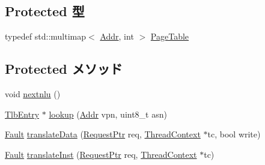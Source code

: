 \subsection*{Protected 型}
\begin{DoxyCompactItemize}
\item 
typedef std::multimap$<$ \hyperlink{classm5_1_1params_1_1Addr}{Addr}, int $>$ \hyperlink{classAlphaISA_1_1TLB_a18f97eb978c56b976c0eadbf9212d206}{PageTable}
\end{DoxyCompactItemize}
\subsection*{Protected メソッド}
\begin{DoxyCompactItemize}
\item 
void \hyperlink{classAlphaISA_1_1TLB_aeb5ba263cf2621ed26767046ab78a1dc}{nextnlu} ()
\item 
\hyperlink{structAlphaISA_1_1TlbEntry}{TlbEntry} $\ast$ \hyperlink{classAlphaISA_1_1TLB_af2081108994a71d701fc459ad161790e}{lookup} (\hyperlink{classm5_1_1params_1_1Addr}{Addr} vpn, uint8\_\-t asn)
\item 
\hyperlink{classRefCountingPtr}{Fault} \hyperlink{classAlphaISA_1_1TLB_ad54aef66412f77e2a15a621a126dfb52}{translateData} (\hyperlink{classRequest}{RequestPtr} req, \hyperlink{classThreadContext}{ThreadContext} $\ast$tc, bool write)
\item 
\hyperlink{classRefCountingPtr}{Fault} \hyperlink{classAlphaISA_1_1TLB_a072afd8ed455dade4c25a85510e5a4da}{translateInst} (\hyperlink{classRequest}{RequestPtr} req, \hyperlink{classThreadContext}{ThreadContext} $\ast$tc)
\end{DoxyCompactItemize}
